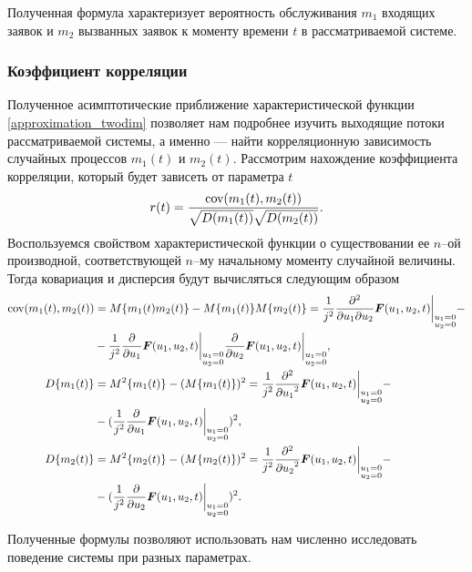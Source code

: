 Полученная формула характеризует вероятность обслуживания $m_{1}$ входящих заявок и $m_{2}$ вызванных заявок к моменту времени $t$ в рассматриваемой системе.

\subsubsection{Коэффициент корреляции} \label{corr_section}
Полученное асимптотические приближение характеристической функции \eqref{approximation_twodim} позволяет нам подробнее изучить выходящие потоки рассматриваемой системы, а именно --- найти корреляционную зависимость случайных процессов $m_{1}(t)$ и $m_{2}(t)$.
Рассмотрим нахождение коэффициента корреляции, который будет зависеть от параметра $t$
\begin{equation*}
	r(t) = \frac{\textnormal{cov}(m_{1}(t),m_{2}(t))}{\sqrt{D(m_{1}(t))}\sqrt{D(m_{2}(t))}}.
\end{equation*}
Воспользуемся свойством характеристической функции о существовании ее $n$--ой производной, соответствующей $n$--му начальному моменту случайной величины. Тогда ковариация и дисперсия будут вычисляться следующим образом
\begin{equation*}
	\begin{split}
		\textnormal{cov}(m_{1}(t),m_{2}(t)) &= M\{m_{1}(t)m_{2}(t)\} - M\{m_{1}(t)\}M\{m_{2}(t)\} = \frac{1}{j^{2}}\frac{{\partial}^{2}}{{\partial u_{1}}{\partial u_{2}}}\boldsymbol{F}(u_{1},u_{2},t) \bigg\rvert_{\substack{u_{1} = 0 \\ u_{2} = 0}} - \\ &- \frac{1}{j^{2}} \frac{{\partial}}{{\partial u_{1}}} \boldsymbol{F}(u_{1},u_{2},t) \bigg\rvert_{\substack{u_{1} = 0 \\ u_{2} = 0}} \frac{{\partial}}{{\partial u_{2}}} \boldsymbol{F}(u_{1},u_{2},t) \bigg\rvert_{\substack{u_{1} = 0 \\ u_{2} = 0}},
		\\
		D\{m_{1}(t)\} &= M^{2}\{m_{1}(t)\} - (M\{m_{1}(t)\})^{2} = \frac{1}{j^{2}}\frac{{\partial}^{2}}{{\partial u_{1}}^{2}}\boldsymbol{F}(u_{1},u_{2},t) \bigg\rvert_{\substack{u_{1} = 0 \\ u_{2} = 0}}  - \\ &- (\frac{1}{j^{2}} \frac{{\partial}}{{\partial u_{1}}} \boldsymbol{F}(u_{1},u_{2},t) \bigg\rvert_{\substack{u_{1} = 0 \\ u_{2} = 0}})^{2},
		\\
		D\{m_{2}(t)\} &= M^{2}\{m_{2}(t)\} - (M\{m_{2}(t)\})^{2} = \frac{1}{j^{2}}\frac{{\partial}^{2}}{{\partial u_{2}}^{2}}\boldsymbol{F}(u_{1},u_{2},t) \bigg\rvert_{\substack{u_{1} = 0 \\ u_{2} = 0}}  - \\ &- (\frac{1}{j^{2}} \frac{{\partial}}{{\partial u_{2}}} \boldsymbol{F}(u_{1},u_{2},t) \bigg\rvert_{\substack{u_{1} = 0 \\ u_{2} = 0}})^{2}.
	\end{split}
\end{equation*}

Полученные формулы позволяют использовать нам численно исследовать поведение системы при разных параметрах.
\clearpage